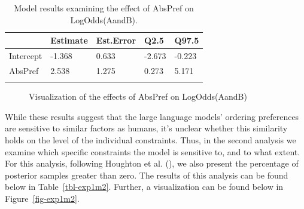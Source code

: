 \documentclass[
  nottoc]{article}
\begin{document}
\begin{longtable}[]{@{}lllll@{}}

\toprule\noalign{}
& Estimate & Est.Error & Q2.5 & Q97.5 \\
\midrule\noalign{}
\endhead
\bottomrule\noalign{}
\endlastfoot
Intercept & -1.368 & 0.633 & -2.673 & -0.223 \\
AbsPref & 2.538 & 1.275 & 0.273 & 5.171 \\


\caption{\label{tbl-exp1m1}Model results examining the effect of AbsPref
on LogOdds(AandB).}

\tabularnewline
\end{longtable}

\begin{figure}


\caption{\label{fig-exp1m1}Visualization of the effects of AbsPref on
LogOdds(AandB)}

\end{figure}%

While these results suggest that the large language models' ordering
preferences are sensitive to similar factors as humans, it's unclear
whether this similarity holds on the level of the individual
constraints. Thus, in the second analysis we examine which specific
constraints the model is sensitive to, and to what extent. For this
analysis, following Houghton et al.
(),
we also present the percentage of posterior samples greater than zero.
The results of this analysis can be found below in
Table~\ref{tbl-exp1m2}. Further, a visualization can be found below in
Figure~\ref{fig-exp1m2}.
\end{document}

